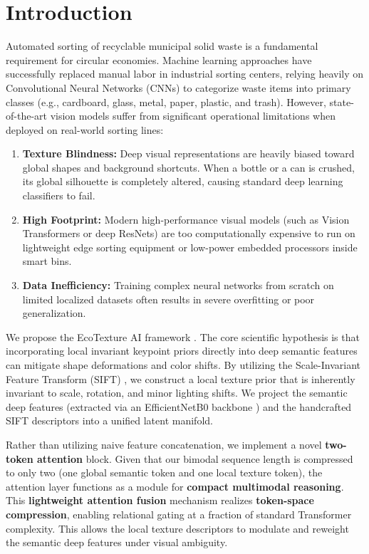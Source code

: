 \documentclass[12pt, a4paper]{article}
\begin{document}
\section{Introduction}
\label{sec:intro}
Automated sorting of recyclable municipal solid waste is a fundamental requirement for circular economies. Machine learning approaches have successfully replaced manual labor in industrial sorting centers, relying heavily on Convolutional Neural Networks (CNNs) to categorize waste items into primary classes (e.g., cardboard, glass, metal, paper, plastic, and trash). However, state-of-the-art vision models suffer from significant operational limitations when deployed on real-world sorting lines:
\begin{enumerate}
    \item \textbf{Texture Blindness:} Deep visual representations are heavily biased toward global shapes and background shortcuts. When a bottle or a can is crushed, its global silhouette is completely altered, causing standard deep learning classifiers to fail.
    \item \textbf{High Footprint:} Modern high-performance visual models (such as Vision Transformers or deep ResNets) are too computationally expensive to run on lightweight edge sorting equipment or low-power embedded processors inside smart bins.
    \item \textbf{Data Inefficiency:} Training complex neural networks from scratch on limited localized datasets often results in severe overfitting or poor generalization.
\end{enumerate}

We propose the EcoTexture AI framework \citep{alaa2026ecotexture}. The core scientific hypothesis is that incorporating local invariant keypoint priors directly into deep semantic features can mitigate shape deformations and color shifts. By utilizing the Scale-Invariant Feature Transform (SIFT) \citep{sift}, we construct a local texture prior that is inherently invariant to scale, rotation, and minor lighting shifts. We project the semantic deep features (extracted via an EfficientNetB0 backbone \citep{efficientnet}) and the handcrafted SIFT descriptors into a unified latent manifold.

Rather than utilizing naive feature concatenation, we implement a novel \textbf{two-token attention} block. Given that our bimodal sequence length is compressed to only two (one global semantic token and one local texture token), the attention layer functions as a module for \textbf{compact multimodal reasoning}. This \textbf{lightweight attention fusion} mechanism realizes \textbf{token-space compression}, enabling relational gating at a fraction of standard Transformer complexity. This allows the local texture descriptors to modulate and reweight the semantic deep features under visual ambiguity.
\end{document}

